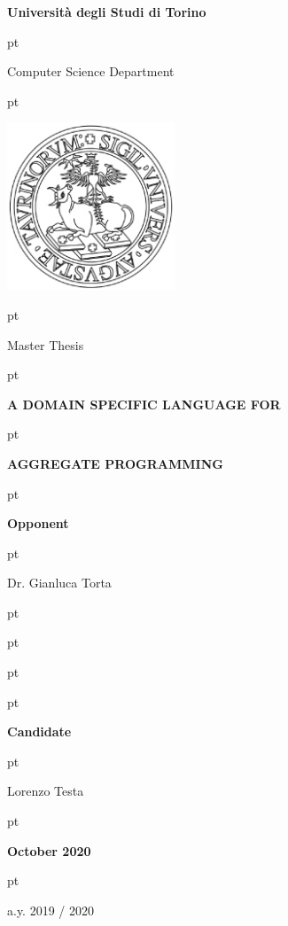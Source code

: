 
\thispagestyle{empty}


\centerline {\LARGE{\textbf{Universit\`a degli Studi di Torino}}}

 pt

\centerline {\Large{Computer Science Department}}

 pt

\centerline {\includegraphics[width=5cm]{imgs/logo_ateneo.jpg}}

 pt

\centerline {\Large {Master Thesis}}

 pt

\centerline {\Large {\bf A DOMAIN SPECIFIC LANGUAGE FOR}}
 pt
\centerline {\Large {\bf AGGREGATE PROGRAMMING}}

 pt

 \hspace{13.7cm} \textbf{Opponent}

 pt

\hspace{.7cm}{Prof. Ferruccio Damiani} \hspace{10.5cm} {Dr. Gianluca Torta}

 pt


 pt

\hspace{.7cm}{Dr. Audrito Giorgio}

 pt

\hspace{.7cm}{Dr. Pianini Danilo}

 pt

\centerline {\textbf{Candidate}}

 pt

\centerline {Lorenzo Testa}

 pt

\centerline{\bf October 2020}

 pt

\centerline{a.y.  2019 / 2020}

\restoregeometry